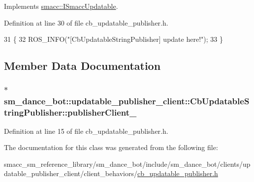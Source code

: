Implements \hyperlink{classsmacc_1_1ISmaccUpdatable_a84ee0520cbefdb1d412bed54650b028e}{smacc\+::\+I\+Smacc\+Updatable}.



Definition at line 30 of file cb\+\_\+updatable\+\_\+publisher.\+h.


\begin{DoxyCode}
31     \{
32         ROS\_INFO(\textcolor{stringliteral}{"[CbUpdatableStringPublisher] update here!"});
33     \}
\end{DoxyCode}


\subsection{Member Data Documentation}
\subsubsection[{\texorpdfstring{publisher\+Client\+\_\+}{publisherClient_}}]{$\ast$ sm\+\_\+dance\+\_\+bot\+::updatable\+\_\+publisher\+\_\+client\+::\+Cb\+Updatable\+String\+Publisher\+::publisher\+Client\+\_\+}\hypertarget{classsm__dance__bot_1_1updatable__publisher__client_1_1CbUpdatableStringPublisher_aa8b2dfbd6b745e3ad2a79520d0a7acba}{}\label{classsm__dance__bot_1_1updatable__publisher__client_1_1CbUpdatableStringPublisher_aa8b2dfbd6b745e3ad2a79520d0a7acba}


Definition at line 15 of file cb\+\_\+updatable\+\_\+publisher.\+h.



The documentation for this class was generated from the following file\+:\begin{DoxyCompactItemize}
\item 
smacc\+\_\+sm\+\_\+reference\+\_\+library/sm\+\_\+dance\+\_\+bot/include/sm\+\_\+dance\+\_\+bot/clients/updatable\+\_\+publisher\+\_\+client/client\+\_\+behaviors/\hyperlink{cb__updatable__publisher_8h}{cb\+\_\+updatable\+\_\+publisher.\+h}\end{DoxyCompactItemize}
